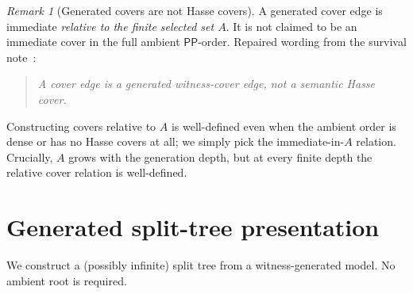 \documentclass[11pt]{article}
\theoremstyle{definition}
\theoremstyle{remark}
\newtheorem{remark}[theorem]{Remark}
\newcommand{\PP}{\mathsf{PP}}
\begin{document}
\begin{remark}[Generated covers are not Hasse covers]
A generated cover edge is immediate \emph{relative to the finite
selected set $A$}.  It is not claimed to be an immediate cover in
the full ambient $\PP$-order.  Repaired wording from the survival
note~\cite{GPT55Survival}:
\begin{quote}
\emph{A cover edge is a generated witness-cover edge, not a
semantic Hasse cover.}
\end{quote}
Constructing covers relative to $A$ is well-defined even when the
ambient order is dense or has no Hasse covers at all; we simply
pick the immediate-in-$A$ relation.  Crucially, $A$ grows with the
generation depth, but at every finite depth the relative cover
relation is well-defined.
\end{remark}


\section{Generated split-tree presentation}
\label{sec:split-tree}

We construct a (possibly infinite) split tree from a witness-generated
model.  No ambient root is required.
\end{document}
